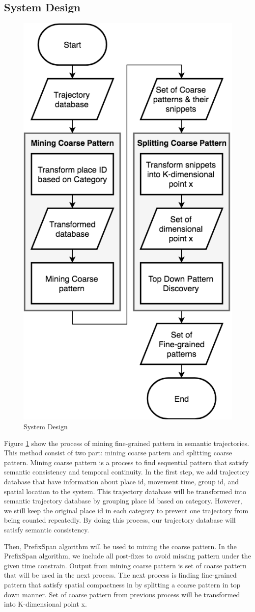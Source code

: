 \documentclass[conference]{IEEEtran}
\begin{document}
\subsection{System Design}
\begin{figure}[!ht]
\centering
\includegraphics[width=0.55\linewidth]{splitter}
\caption{System Design}
\label{fig:systemdesign}
\end{figure}
Figure \ref{fig:systemdesign} show the process of mining fine-grained pattern in semantic trajectories. This method consist of two part: mining coarse pattern and splitting coarse pattern. Mining coarse pattern is a process to find sequential pattern that satisfy semantic consistency and temporal continuity. In the first step, we add trajectory database that have information about place id, movement time, group id, and spatial location to the system. This trajectory database will be transformed into semantic trajectory database by grouping place id based on category. However, we still keep the original place id in each category to prevent one trajectory from being counted repeatedly. By doing this process, our trajectory database will satisfy semantic consistency.
\par
Then, PrefixSpan algorithm will be used to mining the coarse pattern. In the PrefixSpan algorithm, we include all post-fixes to avoid missing pattern under the given time constrain. Output from mining coarse pattern is set of coarse pattern that will be used in the next process. The next process is finding fine-grained pattern that satisfy spatial compactness in by splitting a coarse pattern in top down manner. Set of coarse pattern from previous process will be transformed into K-dimensional point x.
\end{document}
